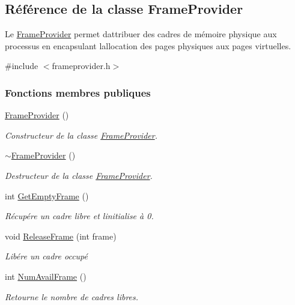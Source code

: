 \hypertarget{class_frame_provider}{}\subsection{Référence de la classe Frame\+Provider}
\label{class_frame_provider}


Le \hyperlink{class_frame_provider}{Frame\+Provider} permet d\textquotesingle{}attribuer des cadres de mémoire physique aux processus en encapsulant l\textquotesingle{}allocation des pages physiques aux pages virtuelles.  




{\ttfamily \#include $<$frameprovider.\+h$>$}

\subsubsection*{Fonctions membres publiques}
\begin{DoxyCompactItemize}
\item 
\hypertarget{class_frame_provider_aab862343741993c0eebad9d25d1762ae}{}\label{class_frame_provider_aab862343741993c0eebad9d25d1762ae} 
\hyperlink{class_frame_provider_aab862343741993c0eebad9d25d1762ae}{Frame\+Provider} ()
\begin{DoxyCompactList}\small\item\em Constructeur de la classe \hyperlink{class_frame_provider}{Frame\+Provider}. \end{DoxyCompactList}\item 
\hypertarget{class_frame_provider_a5f1f4d140636a7201e89b646c5a4380d}{}\label{class_frame_provider_a5f1f4d140636a7201e89b646c5a4380d} 
\hyperlink{class_frame_provider_a5f1f4d140636a7201e89b646c5a4380d}{$\sim$\+Frame\+Provider} ()
\begin{DoxyCompactList}\small\item\em Destructeur de la classe \hyperlink{class_frame_provider}{Frame\+Provider}. \end{DoxyCompactList}\item 
int \hyperlink{class_frame_provider_a24e2dbd45651d75f94d0f6fb3920b70b}{Get\+Empty\+Frame} ()
\begin{DoxyCompactList}\small\item\em Récupére un cadre libre et l\textquotesingle{}initialise à 0. \end{DoxyCompactList}\item 
void \hyperlink{class_frame_provider_a42f08056453908df534cfc3c086d71a2}{Release\+Frame} (int frame)
\begin{DoxyCompactList}\small\item\em Libére un cadre occupé \end{DoxyCompactList}\item 
\hypertarget{class_frame_provider_a39d96ba2ec4289234e2201c30a7a0fd3}{}\label{class_frame_provider_a39d96ba2ec4289234e2201c30a7a0fd3} 
int \hyperlink{class_frame_provider_a39d96ba2ec4289234e2201c30a7a0fd3}{Num\+Avail\+Frame} ()
\begin{DoxyCompactList}\small\item\em Retourne le nombre de cadres libres. \end{DoxyCompactList}\end{DoxyCompactItemize}
